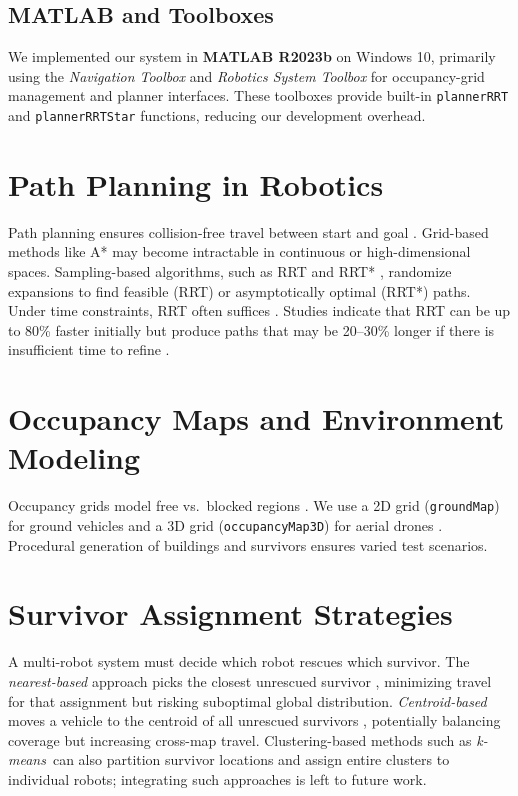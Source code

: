 \documentclass[12pt,a4paper]{report}
\begin{document}
\subsection*{MATLAB and Toolboxes}
We implemented our system in \textbf{MATLAB R2023b} on Windows 10, primarily using the 
\emph{Navigation Toolbox} and \emph{Robotics System Toolbox} for occupancy-grid management 
and planner interfaces. These toolboxes provide built-in \texttt{plannerRRT} and 
\texttt{plannerRRTStar} functions, reducing our development overhead.

\section{Path Planning in Robotics}
\label{sec:path_planning_robotics}
Path planning ensures collision-free travel between start and goal \cite{Orthey2024SBMPReview}. 
Grid-based methods like A* may become intractable in continuous or high-dimensional spaces. 
Sampling-based algorithms, such as RRT \cite{LaValle2001RRT} and RRT* \cite{Karaman2011RRTstar}, randomize expansions to find feasible 
(RRT) or asymptotically optimal (RRT*) paths. Under time constraints, RRT often suffices \cite{Zhang2024ShrinkingPOMCP}. 
Studies indicate that RRT can be up to 80\% faster initially but produce paths that may be 
20--30\% longer if there is insufficient time to refine \cite{Kuffner2000RRTProgress,Karaman2010RSSIncremental}.

\section{Occupancy Maps and Environment Modeling}
\label{sec:occ_maps_env_modeling}
Occupancy grids model free vs.\ blocked regions \cite{Elfes1989OccupancyGrid,Raja2024OGMCBF}. We use a 2D grid
(\texttt{groundMap}) for ground vehicles and a 3D grid (\texttt{occupancyMap3D}) for aerial
drones \cite{Merei2025UAVObstacleSurvey}. Procedural generation of buildings and survivors ensures varied
test scenarios. 

\section{Survivor Assignment Strategies}
\label{sec:survivor_assignment}
A multi-robot system must decide which robot rescues which survivor. The \emph{nearest-based}
approach picks the closest unrescued survivor \cite{Ghassemi2021NearestNeighbor}, minimizing travel for that assignment
but risking suboptimal global distribution. \emph{Centroid-based} moves a vehicle to the
centroid of all unrescued survivors \cite{Ho2016CentroidAssign}, potentially balancing coverage but
increasing cross-map travel. Clustering-based methods such as \textit{k-means}\,\cite{Dias2006MarketBased} can also partition survivor locations and assign entire clusters to individual robots; integrating such approaches is left to future work.
\end{document}
